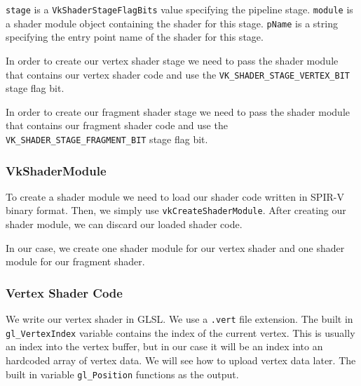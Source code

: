 \texttt{stage} is a \texttt{VkShaderStageFlagBits} value specifying the
pipeline stage.
\texttt{module} is a shader module object containing the shader for this stage.
\texttt{pName} is a string specifying the entry point name of the shader for this
stage.

\begin{minipage}{\linewidth}{\noindent}
    
\end{minipage}

In order to create our vertex shader stage we need to pass the shader module
that contains our vertex shader code and use the
\texttt{VK\_SHADER\_STAGE\_VERTEX\_BIT} stage flag bit.

In order to create our fragment shader stage we need to pass the shader module
that contains our fragment shader code and use the
\mbox{\texttt{VK\_SHADER\_STAGE\_FRAGMENT\_BIT}} stage flag bit.

\subsubsection{VkShaderModule}

To create a shader module we need to load our shader code written
in SPIR-V binary format.
Then, we simply use \texttt{vkCreateShaderModule}.
After creating our shader module, we can discard our loaded shader code.

\begin{minipage}{\linewidth}{\noindent}
    
\end{minipage}

In our case, we create one shader module for our vertex shader and one shader
module for our fragment shader.

\subsubsection{Vertex Shader Code}

We write our vertex shader in GLSL.
We use a \texttt{.vert} file extension.
The built in \texttt{gl\_VertexIndex} variable contains the index of the
current vertex.
This is usually an index into the vertex buffer, but in our case
it will be an index into an hardcoded array of vertex data.
We will see how to upload vertex data later.
The built in variable \texttt{gl\_Position} functions as the output.

